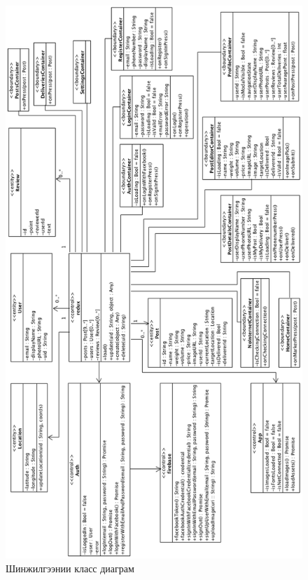 \begin{figure}[H]
    \centering
	\includegraphics[height=.88\textheight]{Figures/shinjilgee/class_diagram.png}
	\caption{Шинжилгээнии класс диаграм}
\end{figure}


